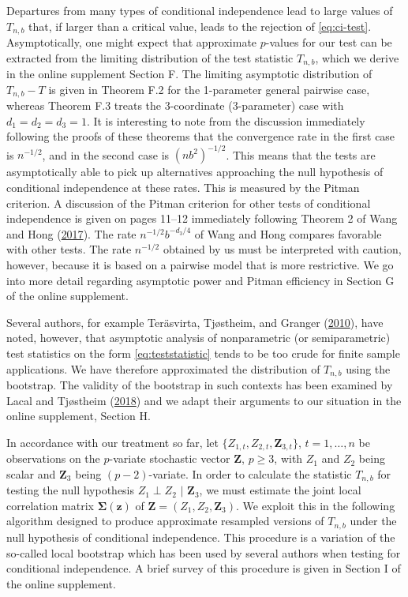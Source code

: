 \documentclass[
  12pt,
  letterpaper]{article}
\newcommand{\Z}{\bm{Z}}
\newcommand{\z}{\bm{z}}
\newcommand{\fSigma}{\bm{\Sigma}}
\theoremstyle{definition}
\theoremstyle{definition}
\theoremstyle{definition}
\theoremstyle{remark}
\begin{document}
Departures from many types of conditional independence lead to large values of \(T_{n,b}\) that, if larger than a critical value, leads to the rejection of \eqref{eq:ci-test}. Asymptotically, one might expect that approximate \(p\)-values for our test can be extracted from the limiting distribution of the test statistic \(T_{n,b}\), which we derive in the online supplement Section F. The limiting asymptotic distribution of \(T_{n,b}-T\) is given in Theorem F.2 for the 1-parameter general pairwise case, whereas Theorem F.3 treats the 3-coordinate (3-parameter) case with \(d_1=d_2=d_3=1\). It is interesting to note from the discussion immediately following the proofs of these theorems that the convergence rate in the first case is \(n^{-1/2}\), and in the second case is \(\left(nb^2\right)^{-1/2}\). This means that the tests are asymptotically able to pick up alternatives approaching the null hypothesis of conditional independence at these rates. This is measured by the Pitman criterion. A discussion of the Pitman criterion for other tests of conditional independence is given on pages 11--12 immediately following Theorem 2 of Wang and Hong (\protect\hyperlink{ref-wang2017characteristic}{2017}). The rate \(n^{-1/2}b^{-d_3/4}\) of Wang and Hong compares favorable with other tests. The rate \(n^{-1/2}\) obtained by us must be interpreted with caution, however, because it is based on a pairwise model that is more restrictive. We go into more detail regarding asymptotic power and Pitman efficiency in Section G of the online supplement.

Several authors, for example Teräsvirta, Tjøstheim, and Granger (\protect\hyperlink{ref-terasvirta2010modelling}{2010}), have noted, however, that asymptotic analysis of nonparametric (or semiparametric) test statistics on the form \eqref{eq:teststatistic} tends to be too crude for finite sample applications. We have therefore approximated the distribution of \(T_{n,b}\) using the bootstrap. The validity of the bootstrap in such contexts has been examined by Lacal and Tjøstheim (\protect\hyperlink{ref-lacal2018estimating}{2018}) and we adapt their arguments to our situation in the online supplement, Section H.

In accordance with our treatment so far, let \(\{Z_{1,t}, Z_{2, t}, \Z_{3, t}\}\), \(t = 1,\ldots,n\) be observations on the \(p\)-variate stochastic vector \(\Z\), \(p\geq3\), with \(Z_1\) and \(Z_2\) being scalar and \(\Z_3\) being \((p-2)\)-variate. In order to calculate the statistic \(T_{n,b}\) for testing the null hypothesis \(Z_1 \perp Z_2 \,\,|\,\, \Z_3\), we must estimate the joint local correlation matrix \(\fSigma(\z)\) of \(\Z = (Z_1, Z_2, \Z_3)\). We exploit this in the following algorithm designed to produce approximate resampled versions of \(T_{n,b}\) under the null hypothesis of conditional independence. This procedure is a variation of the so-called local bootstrap which has been used by several authors when testing for conditional independence. A brief survey of this procedure is given in Section I of the online supplement.
\end{document}
